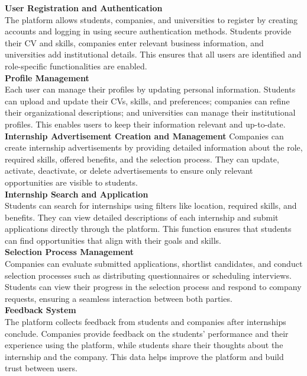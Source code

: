 \textbf{User Registration and Authentication} \\
The platform allows students, companies, and universities to register by creating accounts and logging in using secure authentication methods. Students provide their CV and skills, companies enter relevant business information, and universities add institutional details. This ensures that all users are identified and role-specific functionalities are enabled. \\

\textbf{Profile Management} \\
Each user can manage their profiles by updating personal information. Students can upload and update their CVs, skills, and preferences; companies can refine their organizational descriptions; and universities can manage their institutional profiles. This enables users to keep their information relevant and up-to-date. \\

\textbf{Internship Advertisement Creation and Management}
Companies can create internship advertisements by providing detailed information about the role, required skills, offered benefits, and the selection process. They can update, activate, deactivate, or delete advertisements to ensure only relevant opportunities are visible to students. \\

\textbf{Internship Search and Application} \\
Students can search for internships using filters like location, required skills, and benefits. They can view detailed descriptions of each internship and submit applications directly through the platform. This function ensures that students can find opportunities that align with their goals and skills. \\

\textbf{Selection Process Management} \\
Companies can evaluate submitted applications, shortlist candidates, and conduct selection processes such as distributing questionnaires or scheduling interviews. Students can view their progress in the selection process and respond to company requests, ensuring a seamless interaction between both parties. \\

\textbf{Feedback System} \\
The platform collects feedback from students and companies after internships conclude. Companies provide feedback on the students’ performance and their experience using the platform, while students share their thoughts about the internship and the company. This data helps improve the platform and build trust between users. \\

